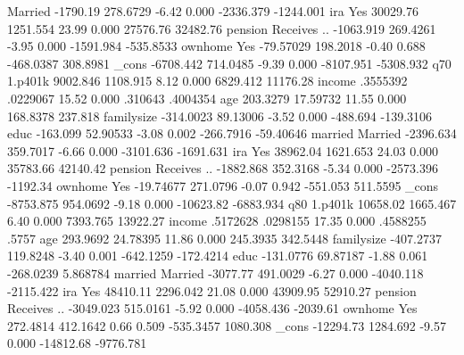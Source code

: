     Married  {\VBAR}   -1790.19   278.6729    -6.42   0.000    -2336.379   -1244.001
             {\VBAR}
         ira {\VBAR}
        Yes  {\VBAR}   30029.76   1251.554    23.99   0.000     27576.76    32482.76
             {\VBAR}
     pension {\VBAR}
Receives ..  {\VBAR}  -1063.919   269.4261    -3.95   0.000    -1591.984   -535.8533
             {\VBAR}
     ownhome {\VBAR}
        Yes  {\VBAR}  -79.57029   198.2018    -0.40   0.688    -468.0387    308.8981
       _cons {\VBAR}  -6708.442   714.0485    -9.39   0.000    -8107.951   -5308.932
q70          {\VBAR}
     1.p401k {\VBAR}   9002.846   1108.915     8.12   0.000     6829.412    11176.28
      income {\VBAR}   .3555392   .0229067    15.52   0.000      .310643    .4004354
         age {\VBAR}   203.3279   17.59732    11.55   0.000     168.8378     237.818
  familysize {\VBAR}  -314.0023   89.13006    -3.52   0.000     -488.694   -139.3106
        educ {\VBAR}   -163.099   52.90533    -3.08   0.002    -266.7916   -59.40646
             {\VBAR}
     married {\VBAR}
    Married  {\VBAR}  -2396.634   359.7017    -6.66   0.000    -3101.636   -1691.631
             {\VBAR}
         ira {\VBAR}
        Yes  {\VBAR}   38962.04   1621.653    24.03   0.000     35783.66    42140.42
             {\VBAR}
     pension {\VBAR}
Receives ..  {\VBAR}  -1882.868   352.3168    -5.34   0.000    -2573.396    -1192.34
             {\VBAR}
     ownhome {\VBAR}
        Yes  {\VBAR}  -19.74677   271.0796    -0.07   0.942     -551.053    511.5595
       _cons {\VBAR}  -8753.875   954.0692    -9.18   0.000    -10623.82   -6883.934
q80          {\VBAR}
     1.p401k {\VBAR}   10658.02   1665.467     6.40   0.000     7393.765    13922.27
      income {\VBAR}   .5172628   .0298155    17.35   0.000     .4588255       .5757
         age {\VBAR}   293.9692   24.78395    11.86   0.000     245.3935    342.5448
  familysize {\VBAR}  -407.2737   119.8248    -3.40   0.001    -642.1259   -172.4214
        educ {\VBAR}  -131.0776   69.87187    -1.88   0.061    -268.0239    5.868784
             {\VBAR}
     married {\VBAR}
    Married  {\VBAR}   -3077.77   491.0029    -6.27   0.000    -4040.118   -2115.422
             {\VBAR}
         ira {\VBAR}
        Yes  {\VBAR}   48410.11   2296.042    21.08   0.000     43909.95    52910.27
             {\VBAR}
     pension {\VBAR}
Receives ..  {\VBAR}  -3049.023   515.0161    -5.92   0.000    -4058.436    -2039.61
             {\VBAR}
     ownhome {\VBAR}
        Yes  {\VBAR}   272.4814   412.1642     0.66   0.509    -535.3457    1080.308
       _cons {\VBAR}  -12294.73   1284.692    -9.57   0.000    -14812.68   -9776.781
